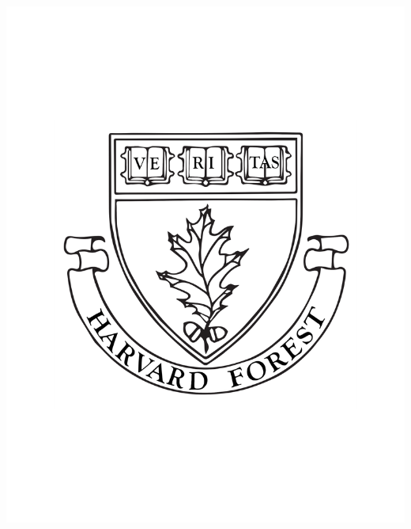 \documentclass[a0,landscape]{a0poster}
\begin{document}
\begin{minipage}[t]{0.12\linewidth}
\includegraphics[width=17cm]{hf.pdf} %
\end{minipage}

\vspace{1cm} %

\end{document}
